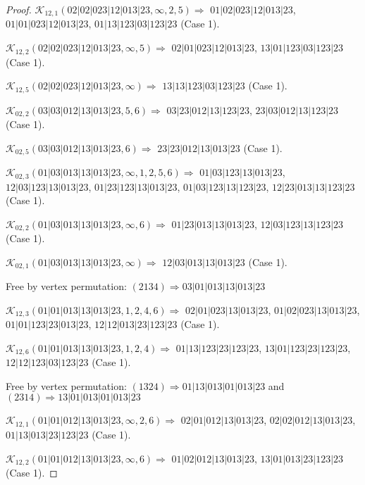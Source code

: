 \documentclass[12pt]{article}
\theoremstyle{plain}
\theoremstyle{definition}
\theoremstyle{remark}
\newcommand{\fancy}[1]{\mathcal{#1}}
\def\K{\fancy{K}}
\begin{document}
\begin{proof}
	\bigskip
	
	$\K_{12,1}(02|02|023|12|013|23,\infty,2, 5)\Rightarrow $ $01|02|023|12|013|23$, $01|01|023|12|013|23$, $01|13|123|03|123|23$ (Case 1).
	
	$\K_{12,2}(02|02|023|12|013|23,\infty,5)\Rightarrow $ $02|01|023|12|013|23$, $13|01|123|03|123|23$ (Case 1).
	
	$\K_{12,5}(02|02|023|12|013|23,\infty)\Rightarrow $ $13|13|123|03|123|23$ (Case 1).
	
	
	\bigskip
	
	$\K_{02,2}(03|03|012|13|013|23,5, 6)\Rightarrow $ $03|23|012|13|123|23$, $23|03|012|13|123|23$ (Case 1).
	
	$\K_{02,5}(03|03|012|13|013|23,6)\Rightarrow $ $23|23|012|13|013|23$ (Case 1).
	
	
	\bigskip
	
	$\K_{02,3}(01|03|013|13|013|23,\infty,1, 2, 5, 6)\Rightarrow $ $01|03|123|13|013|23$, $12|03|123|13|013|23$, $01|23|123|13|013|23$, $01|03|123|13|123|23$, $12|23|013|13|123|23$ (Case 1).
	
	$\K_{02,2}(01|03|013|13|013|23,\infty,6)\Rightarrow $ $01|23|013|13|013|23$, $12|03|123|13|123|23$ (Case 1).
	
	$\K_{02,1}(01|03|013|13|013|23,\infty)\Rightarrow $ $12|03|013|13|013|23$ (Case 1).
	
	
	
	Free by vertex permutation: $(2 1 3 4)\Rightarrow 03|01|013|13|013|23$
	
	
	
	\bigskip
	
	$\K_{12,3}(01|01|013|13|013|23,1, 2, 4, 6)\Rightarrow $ $02|01|023|13|013|23$, $01|02|023|13|013|23$, $01|01|123|23|013|23$, $12|12|013|23|123|23$ (Case 1).
	
	$\K_{12,6}(01|01|013|13|013|23,1, 2, 4)\Rightarrow $ $01|13|123|23|123|23$, $13|01|123|23|123|23$, $12|12|123|03|123|23$ (Case 1).
	
	
	
	Free by vertex permutation: $(1 3 2 4)\Rightarrow 01|13|013|01|013|23$ and $(2 3 1 4)\Rightarrow 13|01|013|01|013|23$
	
	
	
	\bigskip
	
	$\K_{12,1}(01|01|012|13|013|23,\infty,2, 6)\Rightarrow $ $02|01|012|13|013|23$, $02|02|012|13|013|23$, $01|13|013|23|123|23$ (Case 1).
	
	$\K_{12,2}(01|01|012|13|013|23,\infty,6)\Rightarrow $ $01|02|012|13|013|23$, $13|01|013|23|123|23$ (Case 1).
	

\end{proof}
\end{document}
